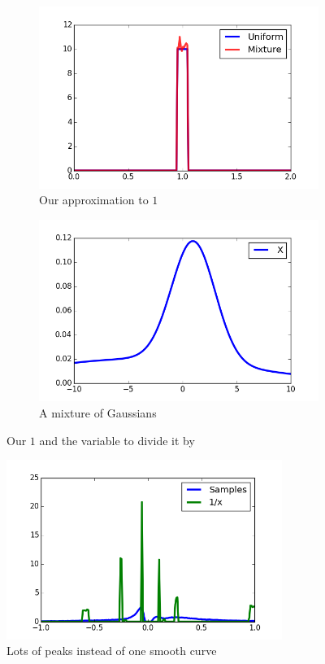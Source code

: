 \documentclass[11pt,a4paper]{book}
\begin{document}
\begin{figure}[h]
  \centering
  \begin{subfigure}[t]{0.45\textwidth}
    \centering
    \includegraphics[width=\textwidth]{thesis/complex/reciprocal-one}
    \caption{Our approximation to $1$}
  \end{subfigure}
  \hfill
  \begin{subfigure}[t]{0.45\textwidth}
    \centering
    \includegraphics[width=\textwidth]{thesis/complex/reciprocal-x}
    \caption{A mixture of Gaussians}
  \end{subfigure}
  \caption{Our $1$ and the variable to divide it by}
  \label{fig:reciprocal-vars}
\end{figure}
\begin{figure}[h]
  \centering
  \includegraphics[width=0.8\textwidth]{thesis/complex/reciprocal-result}
  \caption{Lots of peaks instead of one smooth curve}
  \label{fig:reciprocal-result}
\end{figure}
\end{document}
